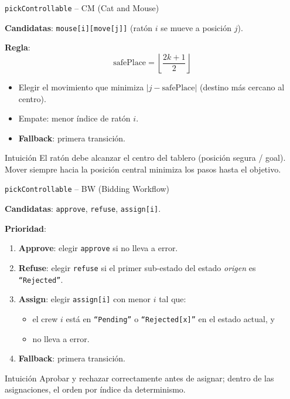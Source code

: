 \documentclass{beamer}
\begin{document}
\begin{frame}{\texttt{pickControllable} -- CM (Cat and Mouse)}

\textbf{Candidatas}: \texttt{mouse[i][move[j]]} (rat\'on $i$ se mueve a posici\'on $j$).

\bigskip
\textbf{Regla}:
\[
  \text{safePlace} = \left\lfloor\frac{2k+1}{2}\right\rfloor
\]
\begin{itemize}
  \item Elegir el movimiento que minimiza $|j - \text{safePlace}|$ (destino m\'as cercano al centro).
  \item Empate: menor \'indice de rat\'on $i$.
  \item \textbf{Fallback}: primera transici\'on.
\end{itemize}

\bigskip
\begin{block}{Intuici\'on}
El rat\'on debe alcanzar el centro del tablero (posici\'on segura / goal). Mover siempre hacia la posici\'on central minimiza los pasos hasta el objetivo.
\end{block}
\end{frame}

\begin{frame}{\texttt{pickControllable} -- BW (Bidding Workflow)}

\textbf{Candidatas}: \texttt{approve}, \texttt{refuse}, \texttt{assign[i]}.

\bigskip
\textbf{Prioridad}:
\begin{enumerate}
  \item \textbf{Approve}: elegir \texttt{approve} si no lleva a error.
  \item \textbf{Refuse}: elegir \texttt{refuse} si el primer sub-estado del estado \emph{origen} es \texttt{``Rejected''}.
  \item \textbf{Assign}: elegir \texttt{assign[i]} con menor $i$ tal que:
    \begin{itemize}
      \item el crew $i$ est\'a en \texttt{``Pending''} o \texttt{``Rejected[x]''} en el estado actual, y
      \item no lleva a error.
    \end{itemize}
  \item \textbf{Fallback}: primera transici\'on.
\end{enumerate}

\bigskip
\begin{block}{Intuici\'on}
Aprobar y rechazar correctamente antes de asignar; dentro de las asignaciones, el orden por \'indice da determinismo.
\end{block}
\end{frame}
\end{document}
